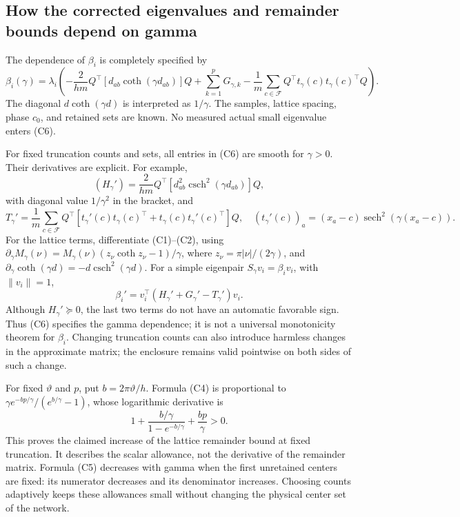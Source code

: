 \documentclass[11pt]{article}
\begin{document}
\subsection{How the corrected eigenvalues and remainder bounds depend on gamma}

The dependence of \(\beta_i\) is completely specified by
\[
\beta_i(\gamma)=\lambda_i\left(
-\frac{2}{hm}Q^\top[d_{ab}\coth(\gamma d_{ab})]Q
+\sum_{k=1}^{p}G_{\gamma,k}
-\frac1m\sum_{c\in\mathcal F}Q^\top t_\gamma(c)t_\gamma(c)^\top Q
\right).
\tag{C6}
\]
The diagonal \(d\coth(\gamma d)\) is interpreted as \(1/\gamma\). The samples, lattice spacing, phase \(c_0\), and retained sets are known. No measured actual small eigenvalue enters (C6).

For fixed truncation counts and sets, all entries in (C6) are smooth for \(\gamma>0\). Their derivatives are explicit. For example,
\[
(H_\gamma')=\frac{2}{hm}Q^\top
[d_{ab}^2\operatorname{csch}^2(\gamma d_{ab})]Q,
\]
with diagonal value \(1/\gamma^2\) in the bracket, and
\[
T_\gamma'=\frac1m\sum_{c\in\mathcal F}Q^\top
[t_\gamma'(c)t_\gamma(c)^\top+t_\gamma(c)t_\gamma'(c)^\top]Q,
\quad (t_\gamma'(c))_a=(x_a-c)\operatorname{sech}^2(\gamma(x_a-c)).
\]
For the lattice terms, differentiate (C1)--(C2), using
\(\partial_\gamma M_\gamma(\nu)=M_\gamma(\nu)(z_\nu\coth z_\nu-1)/\gamma\),
where \(z_\nu=\pi|\nu|/(2\gamma)\), and
\(\partial_\gamma\coth(\gamma d)=-d\operatorname{csch}^2(\gamma d)\).
For a simple eigenpair \(S_\gamma v_i=\beta_i v_i\), with \(\|v_i\|=1\),
\[
\beta_i'=v_i^\top(H_\gamma'+G_\gamma'-T_\gamma')v_i.
\tag{C7}
\]
Although \(H_\gamma'\succeq0\), the last two terms do not have an automatic favorable sign. Thus (C6) specifies the gamma dependence; it is not a universal monotonicity theorem for \(\beta_i\). Changing truncation counts can also introduce harmless changes in the approximate matrix; the enclosure remains valid pointwise on both sides of such a change.

For fixed \(\vartheta\) and \(p\), put \(b=2\pi\vartheta/h\). Formula (C4) is proportional to
\(\gamma e^{-bp/\gamma}/(e^{b/\gamma}-1)\), whose logarithmic derivative is
\[
1+\frac{b/\gamma}{1-e^{-b/\gamma}}+\frac{bp}{\gamma}>0.
\]
This proves the claimed increase of the lattice remainder bound at fixed truncation. It describes the scalar allowance, not the derivative of the remainder matrix. Formula (C5) decreases with gamma when the first unretained centers are fixed: its numerator decreases and its denominator increases. Choosing counts adaptively keeps these allowances small without changing the physical center set of the network.
\end{document}
